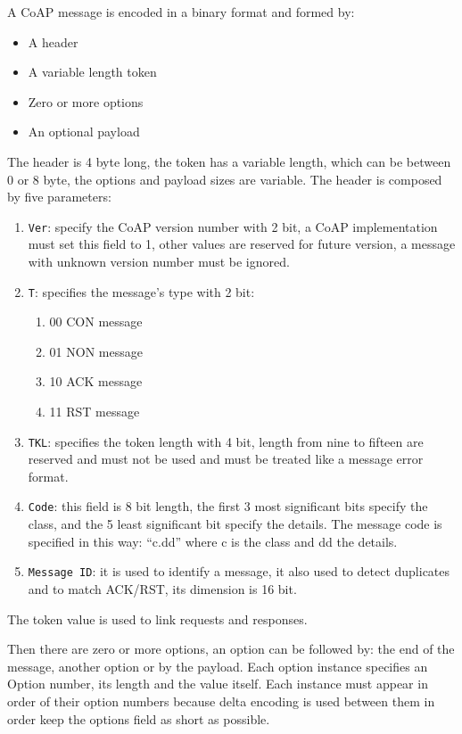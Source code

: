 	A CoAP message is encoded in a binary format and formed by:\newline
	\begin{itemize}
		\item A header
		\item A variable length token
		\item Zero or more options
		\item An optional payload
	\end{itemize}
	The header is 4 byte long, the token has a variable length, which can be between 0 or 8 byte, the options and payload sizes are variable.\newline
	The header is composed by five parameters:\newline
	\begin{enumerate}
		\item \texttt{Ver}: specify the CoAP version number with 2 bit, a CoAP implementation must set this field to 1, other values are reserved for future version, a message with unknown version number must be ignored.
		\item \texttt{T}: specifies the message's type with 2 bit:
		\begin{enumerate}
			\item 00 CON message
			\item 01 NON message
			\item 10 ACK message
			\item 11 RST message
		\end{enumerate}
		\item \texttt{TKL}: specifies the token length with 4 bit, length from nine to fifteen are reserved and must not be used and must be treated like a message error format.
		\item \texttt{Code}: this field is 8 bit length, the first 3 most significant bits specify the class, and the 5 least significant bit specify the details.
		The message code is specified in this way: “c.dd” where c is the class and dd the details.
		\item \texttt{Message ID}: it is used to identify a message, it also used to detect duplicates and to match ACK/RST, its dimension is 16 bit.
	\end{enumerate}
	
	The token value is used to link requests and responses.\newline

	Then there are zero or more options, an option can be followed by: the end of the message, another option or by the payload.\newline
	Each option instance specifies an Option number, its length and the value itself.\newline
	Each instance must appear in order of their option numbers because delta encoding is used between them in order keep the options field as short as possible.\newline
	
